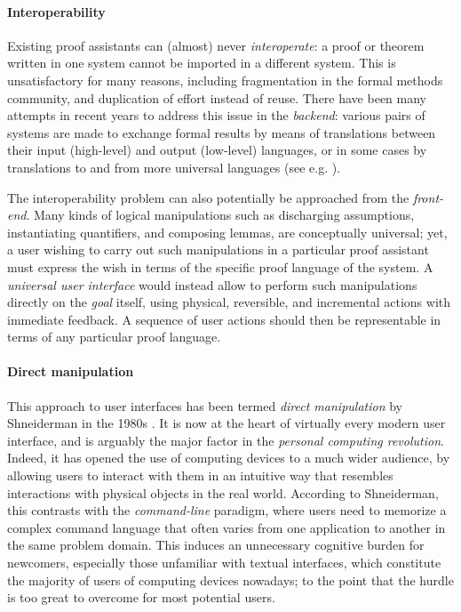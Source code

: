 \paragraph{Interoperability}

Existing proof assistants can (almost) never \emph{interoperate}: a proof or
theorem written in one system cannot be imported in a different system. This is
unsatisfactory for many reasons, including fragmentation in the formal methods
community, and duplication of effort instead of reuse. There have been many
attempts in recent years to address this issue in the \emph{backend}: various
pairs of systems are made to exchange formal results by means of translations
between their input (high-level) and output (low-level) languages, or in some
cases by translations to and from more universal languages (see e.g.
).

The interoperability problem can also potentially be approached from the
\emph{front-end}. Many kinds of logical manipulations such as discharging
assumptions, instantiating quantifiers, and composing lemmas, are conceptually
universal; yet, a user wishing to carry out such manipulations in a particular
proof assistant must express the wish in terms of the specific proof language of
the system. A \emph{universal user interface} would instead allow to perform
such manipulations directly on the \emph{goal} itself, using physical,
reversible, and incremental actions with immediate feedback. A sequence of user
actions should then be representable in terms of any particular proof language.

\paragraph{Direct manipulation}

This approach to user interfaces has been termed \emph{direct manipulation} by
Shneiderman in the 1980s . It is now at the
heart of virtually every modern user interface, and is arguably the major factor
in the \emph{personal computing revolution}. Indeed, it has opened the use of
computing devices to a much wider audience, by allowing users to interact with
them in an intuitive way that resembles interactions with physical objects in
the real world. According to Shneiderman, this contrasts with the
\emph{command-line} paradigm, where users need to memorize a complex command
language that often varies from one application to another in the same problem
domain. This induces an unnecessary cognitive burden for newcomers, especially
those unfamiliar with textual interfaces, which constitute the majority of users
of computing devices nowadays; to the point that the hurdle is too great to
overcome for most potential users.

